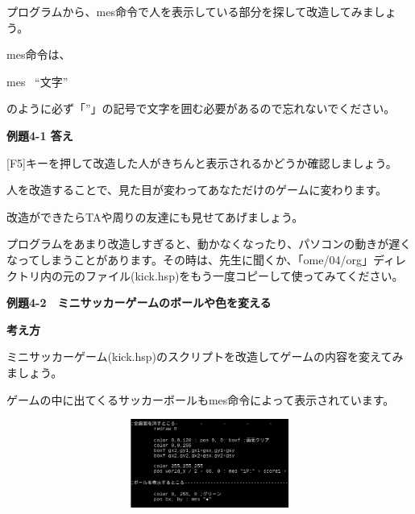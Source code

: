 \documentclass[a4paper,dvipdfmx]{jarticle}
\newcommand\textstyleqwerty[1]{#1}
\begin{document}
\bigskip


\bigskip

プログラムから、mes命令で人を表示している部分を探して改造してみましょう。

mes命令は、


\bigskip

mes \ “文字”


\bigskip

のように必ず「”」の記号で文字を囲む必要があるので忘れないでください。


\bigskip


\bigskip


\bigskip


\bigskip


\bigskip


\bigskip


\bigskip

{\bfseries
例題4-1 答え}


\bigskip

[F5]キーを押して改造した人がきちんと表示されるかどうか確認しましょう。

\textstyleqwerty{人を改造することで、見た目が変わってあなただけのゲームに変わります。}

改造ができたらTAや周りの友達にも見せてあげましょう。


\bigskip

プログラムをあまり改造しすぎると、動かなくなったり、パソコンの動きが遅くなってしまうことがあります。その時は、先生に聞くか、「ome/04/org」ディレクトリ内の元のファイル(kick.hsp)をもう一度コピーして使ってみてください。


\bigskip


\bigskip


\bigskip

\clearpage
\textstyleqwerty{\textbf{例題4-2　ミニサッカーゲームのボールや色を変える}}


\bigskip

{\bfseries
考え方}


\bigskip

ミニサッカーゲーム(kick.hsp)のスクリプトを改造してゲームの内容を変えてみましょう。


\bigskip

ゲームの中に出てくるサッカーボールもmes命令によって表示されています。


\bigskip



\begin{center}
\includegraphics[width=14.499cm,height=2.91cm]{text04-img/text04-img008.png}

\end{center}
\end{document}
